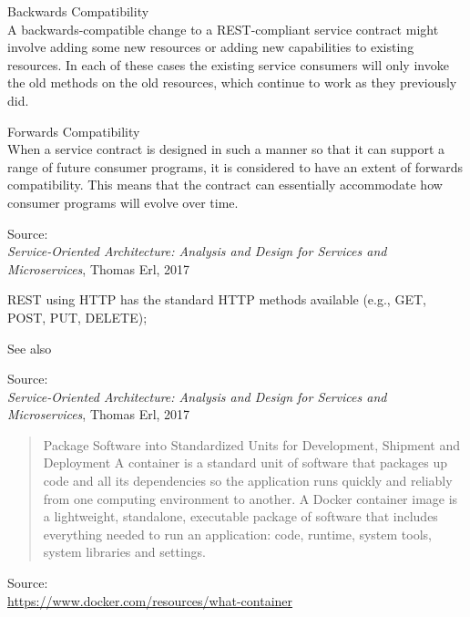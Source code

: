 \documentclass[Screen16to9,17pt]{foils}
\begin{document}

\begin{list2}
\item Backwards Compatibility\\
A backwards-compatible change to a REST-compliant service contract might involve adding some new resources or adding new capabilities to existing resources. In each of these cases the existing service consumers will only invoke the old methods on the old resources, which continue to work as they previously did.
\item Forwards Compatibility\\
When a service contract is designed in such a manner so that it can support a range of future consumer programs, it is considered to have an extent of forwards compatibility. This means that the contract can essentially accommodate how consumer programs will evolve over time.
\end{list2}

Source: {\footnotesize\\
\emph{Service‑Oriented Architecture: Analysis and Design for Services and Microservices}, Thomas Erl, 2017}




\begin{list2}
\item REST using HTTP has the standard HTTP methods available (e.g., GET, POST, PUT, DELETE);
\item See also 
\end{list2}
Source: {\footnotesize\\
\emph{Service‑Oriented Architecture: Analysis and Design for Services and Microservices}, Thomas Erl, 2017}





\begin{quote}
  Package Software into Standardized Units for Development, Shipment and Deployment
  A container is a standard unit of software that packages up code and all its dependencies so the application runs quickly and reliably from one computing environment to another. A Docker container image is a lightweight, standalone, executable package of software that includes everything needed to run an application: code, runtime, system tools, system libraries and settings.
\end{quote}
Source: \\{\footnotesize
\url{https://www.docker.com/resources/what-container}}
\end{document}
